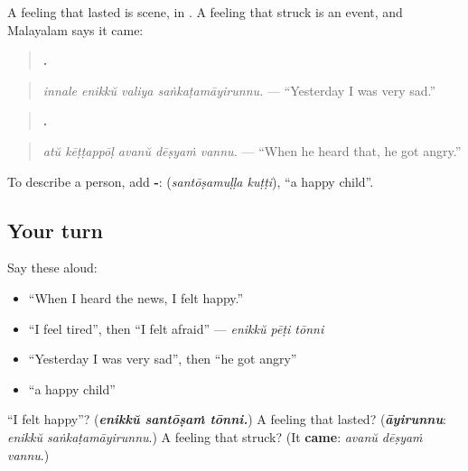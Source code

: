 \begin{grammarlens}[title={Grammar Lens: a feeling as scene, or as event}]
A feeling that lasted is scene, in \textbf{}. A feeling that struck is an event, and Malayalam says it came:

\begin{quote}
\textbf{   .}
\end{quote}

\begin{quote}
\emph{innale enikkŭ valiya saṅkaṭamāyirunnu.} — \textquotedblleft{}Yesterday I was very sad.\textquotedblright{}
\end{quote}

\begin{quote}
\textbf{    .}
\end{quote}

\begin{quote}
\emph{atŭ kēṭṭappōḷ avanŭ dēṣyaṁ vannu.} — \textquotedblleft{}When he heard that, he got angry.\textquotedblright{}
\end{quote}

To describe a person, add \textbf{-}: \textbf{ } (\emph{santōṣamuḷḷa kuṭṭi}), \textquotedblleft{}a happy child\textquotedblright{}.
\end{grammarlens}

\subsection*{Your turn}
Say these aloud:

\begin{itemize}
\raggedright
  \item \textquotedblleft{}When I heard the news, I felt happy.\textquotedblright{}
  \item \textquotedblleft{}I feel tired\textquotedblright{}, then \textquotedblleft{}I felt afraid\textquotedblright{} — \emph{enikkŭ pēṭi tōnni}
  \item \textquotedblleft{}Yesterday I was very sad\textquotedblright{}, then \textquotedblleft{}he got angry\textquotedblright{}
  \item \textquotedblleft{}a happy child\textquotedblright{}
\end{itemize}

\begin{tcolorbox}[breakable,colback=teal!4,colframe=teal!35!black,title={Before you move on}]
\textquotedblleft{}I felt happy\textquotedblright{}? (\emph{\textbf{enikkŭ santōṣaṁ tōnni.}}) A feeling that lasted? (\emph{\textbf{āyirunnu}}: \emph{enikkŭ saṅkaṭamāyirunnu}.) A feeling that struck? (It \textbf{came}: \emph{avanŭ dēṣyaṁ vannu}.)
\end{tcolorbox}
